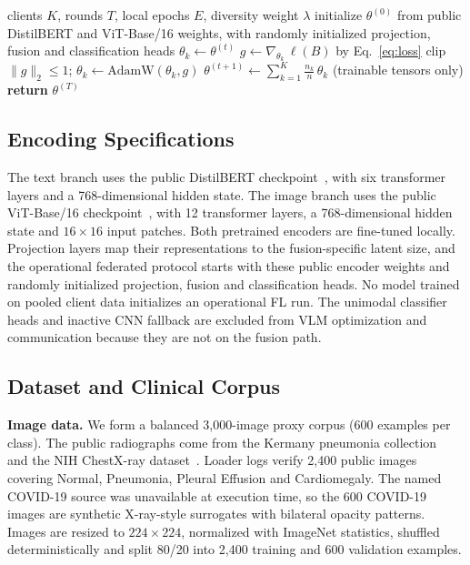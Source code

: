 \documentclass[letterpaper, conference]{IEEEtran}
\begin{document}
\begin{algorithm}[t]
\caption{OmniMed-FL federated training}
\label{alg:omnimedfl}
\small
\begin{algorithmic}[1]
\REQUIRE clients $K$, rounds $T$, local epochs $E$, diversity weight $\lambda$
\STATE initialize $\theta^{(0)}$ from public DistilBERT and ViT-Base/16
weights, with randomly initialized projection, fusion and classification heads
    \STATE $\theta_k \leftarrow \theta^{(t)}$
        \STATE $g \leftarrow \nabla_{\theta_k}\,\ell(B)$ \quad by
        Eq.~\eqref{eq:loss}
        \STATE clip $\|g\|_2 \leq 1$; \; $\theta_k \leftarrow
        \mathrm{AdamW}(\theta_k, g)$
      \ENDFOR
    \ENDFOR
  \ENDFOR
  \STATE $\theta^{(t+1)} \leftarrow \sum_{k=1}^{K}\frac{n_k}{n}\,\theta_k$
  \quad (trainable tensors only)
\ENDFOR
\STATE \textbf{return} $\theta^{(T)}$
\end{algorithmic}
\end{algorithm}

\subsection{Encoding Specifications}
The text branch uses the public DistilBERT checkpoint~\cite{Sanh2019}, with six
transformer layers and a 768-dimensional hidden state. The image branch uses the
public ViT-Base/16 checkpoint~\cite{Dosovitskiy2021}, with 12 transformer layers,
a 768-dimensional hidden state and $16{\times}16$ input patches. Both pretrained
encoders are fine-tuned locally. Projection layers map their representations to
the fusion-specific latent size, and the operational federated protocol starts
with these public encoder weights and randomly initialized projection, fusion and
classification heads. No model trained on pooled client data initializes an
operational FL run. The unimodal classifier heads and inactive CNN fallback are
excluded from VLM optimization and communication because they are not on the
fusion path.

\subsection{Dataset and Clinical Corpus}

\textbf{Image data.}
We form a balanced 3,000-image proxy corpus (600 examples per class). The public
radiographs come from the Kermany pneumonia collection~\cite{Kermany2018} and the
NIH ChestX-ray dataset~\cite{Wang2017chestxray8}. Loader logs verify 2,400 public
images covering Normal, Pneumonia, Pleural Effusion and Cardiomegaly. The named
COVID-19 source was unavailable at execution time, so the 600 COVID-19 images are
synthetic X-ray-style surrogates with bilateral opacity patterns. Images are
resized to $224{\times}224$, normalized with ImageNet statistics, shuffled
deterministically and split 80/20 into 2,400 training and 600 validation examples.
\end{document}
